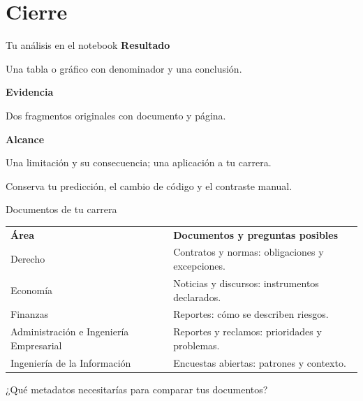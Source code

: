 \section{Cierre}

\begin{frame}[label=entrega]{Tu análisis en el notebook}
\textbf{Resultado}\par
  Una tabla o gráfico con denominador y una conclusión.\par
  \par\vspace{0.3cm}
  \textbf{Evidencia}\par
  Dos fragmentos originales con documento y página.\par
  \par\vspace{0.3cm}
  \textbf{Alcance}\par
  Una limitación y su consecuencia; una aplicación a tu carrera.\par
  \par\vspace{0.35cm}
  Conserva tu predicción, el cambio de código y el contraste manual.\par
\end{frame}

\begin{frame}[label=aplicaciones]{Documentos de tu carrera}
  \renewcommand{\arraystretch}{1.3}
  \begin{tabular}{@{}p{}p{}@{}}
    \textbf{Área} & \textbf{Documentos y preguntas posibles}\\
    Derecho & Contratos y normas: obligaciones y excepciones.\\
    Economía & Noticias y discursos: instrumentos declarados.\\
    Finanzas & Reportes: cómo se describen riesgos.\\
    Administración e Ingeniería Empresarial & Reportes y reclamos: prioridades y problemas.\\
    Ingeniería de la Información & Encuestas abiertas: patrones y contexto.\\
  \end{tabular}\par
  \par\vspace{0.3cm}
  ¿Qué metadatos necesitarías para comparar tus documentos?
\end{frame}

